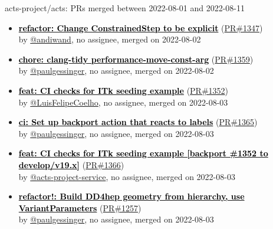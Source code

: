 \begin{frame}[allowframebreaks]{ acts-project/acts: PRs merged 
between 2022-08-01 and 2022-08-11
}
\begin{itemize}
    \item
    \prmerged\textbf{\href{https://github.com/acts-project/acts/pull/1347}{\textcolor{black}{refactor: Change ConstrainedStep to be explicit}}}
    (\href{https://github.com/acts-project/acts/pull/1347}{PR\#1347}) \\
    by \href{https://github.com/andiwand}{@andiwand}, {}no assignee, merged on 2022-08-02

    \item
    \prmerged\textbf{\href{https://github.com/acts-project/acts/pull/1359}{\textcolor{black}{chore: clang-tidy performance-move-const-arg}}}
    (\href{https://github.com/acts-project/acts/pull/1359}{PR\#1359}) \\
    by \href{https://github.com/paulgessinger}{@paulgessinger}, {}no assignee, merged on 2022-08-02

    \item
    \prmerged\textbf{\href{https://github.com/acts-project/acts/pull/1352}{\textcolor{black}{feat: CI checks for ITk seeding example}}}
    (\href{https://github.com/acts-project/acts/pull/1352}{PR\#1352}) \\
    by \href{https://github.com/LuisFelipeCoelho}{@LuisFelipeCoelho}, {}no assignee, merged on 2022-08-03

    \item
    \prmerged\textbf{\href{https://github.com/acts-project/acts/pull/1365}{\textcolor{black}{ci: Set up backport action that reacts to labels}}}
    (\href{https://github.com/acts-project/acts/pull/1365}{PR\#1365}) \\
    by \href{https://github.com/paulgessinger}{@paulgessinger}, {}no assignee, merged on 2022-08-03

    \item
    \prmerged\textbf{\href{https://github.com/acts-project/acts/pull/1366}{\textcolor{black}{feat: CI checks for ITk seeding example [backport \#1352 to develop/v19.x]}}}
    (\href{https://github.com/acts-project/acts/pull/1366}{PR\#1366}) \\
    by \href{https://github.com/acts-project-service}{@acts-project-service}, {}no assignee, merged on 2022-08-03

    \item
    \prmerged\textbf{\href{https://github.com/acts-project/acts/pull/1257}{\textcolor{black}{refactor!: Build DD4hep geometry from hierarchy, use VariantParameters}}}
    (\href{https://github.com/acts-project/acts/pull/1257}{PR\#1257}) \\
    by \href{https://github.com/paulgessinger}{@paulgessinger}, {}no assignee, merged on 2022-08-03


\end{itemize}
\end{frame}
